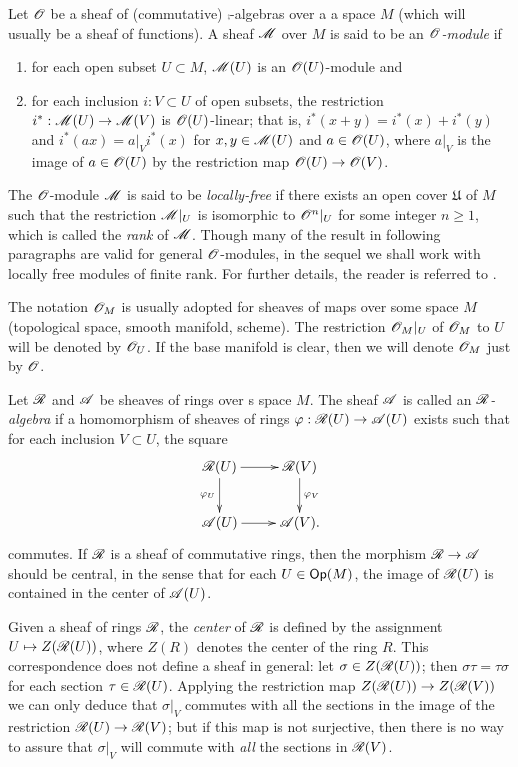 Let $\mathscr{O}$ be a sheaf of (commutative) $\comp$-algebras over a a space $M$ (which will usually be a sheaf of functions). A sheaf $\mathscr{M}$ over $M$ is said to be an \emph{$\mathscr{O}$-module} if 
\begin{enumerate}
\item for each open subset $U\subset M$, $\mathscr{M}(U)$ is an $\mathscr{O}(U)$-module and
\item for each inclusion $i:V\subset U$ of open subsets, the restriction $i^*:\mathscr{M}(U)\to \mathscr{M}(V)$ is $\mathscr{O}(U)$-linear; that is, $i^*(x+y)=i^*(x)+i^*(y)$ and $i^*(ax)=a|_Vi^*(x)$ for $x,y\in \mathscr{M}(U)$ and $a\in \mathscr{O}(U)$, where $a|_V$ is the image of $a\in \mathscr{O}(U)$ by the restriction map $\mathscr{O}(U)\to \mathscr{O}(V)$.
\end{enumerate}
The $\mathscr{O}$-module $\mathscr{M}$ is said to be \emph{locally-free} if there exists an open cover $\mathfrak{U}$ of $M$ such that the restriction $\mathscr{M}|_U$ is isomorphic to $\mathscr{O}^n|_U$ for some integer $n\geqslant 1$, which is called the \emph{rank} of $\mathscr{M}$. Though many of the result in following paragraphs are valid for general $\mathscr{O}$-modules, in the sequel we shall work with locally free modules of finite rank. For further details, the reader is referred to \cite{tennison:_sheaf}. 

\begin{notation}
The notation $\mathscr{O}_M$ is usually adopted for sheaves of maps over some space $M$ (topological space, smooth manifold, scheme). The restriction $\mathscr{O}_M|_U$ of $\mathscr{O}_M$ to $U$ will be denoted by $\mathscr{O}_U$. If the base manifold is clear, then we will denote $\mathscr{O}_M$ just by $\mathscr{O}$.
\end{notation}

\begin{defi}
Let $\mathscr{R}$ and $\mathscr{A}$ be sheaves of rings over s space $M$. The sheaf $\mathscr{A}$ is called an \emph{$\mathscr{R}$-algebra} if a homomorphism of sheaves of rings $\varphi :\mathscr{R}(U)\to \mathscr{A}(U)$ exists such that for each inclusion $V\subset U$, the square
$$
\xymatrix{
\scr{R}(U) \ar[r] \ar[d]_{\varphi_U} & \scr{R}(V) \ar[d]^{\varphi_V} \\
\scr{A}(U) \ar[r] & \scr{A}(V).}
$$
commutes. If $\mathscr{R}$ is a sheaf of commutative rings, then the morphism $\mathscr{R}\to \mathscr{A}$ should be central, in the sense that for each $U\in \mathsf{Op}(M)$, the image of $\mathscr{R}(U)$ is contained in the center of $\mathscr{A}(U)$.
\end{defi}

\begin{obs}
Given a sheaf of rings $\mathscr{R}$, the \emph{center} of $\mathscr{R}$ is defined by the assignment $U\mapsto Z(\mathscr{R}(U))$, where $Z(R)$ denotes the center of the ring $R$. This correspondence does not define a sheaf in general: let $\sigma \in Z(\mathscr{R}(U))$; then $\sigma \tau=\tau \sigma$ for each section $\tau \in \mathscr{R}(U)$. Applying the restriction map $Z(\mathscr{R}(U))\to Z(\mathscr{R}(V))$ we can only deduce that $\sigma |_V$ commutes with all the sections in the image of the restriction $\mathscr{R}(U)\to \mathscr{R}(V)$; but if this map is not surjective, then there is no way to assure that $\sigma |_V$ will commute with \emph{all} the sections in $\mathscr{R}(V)$. 
\end{obs}

